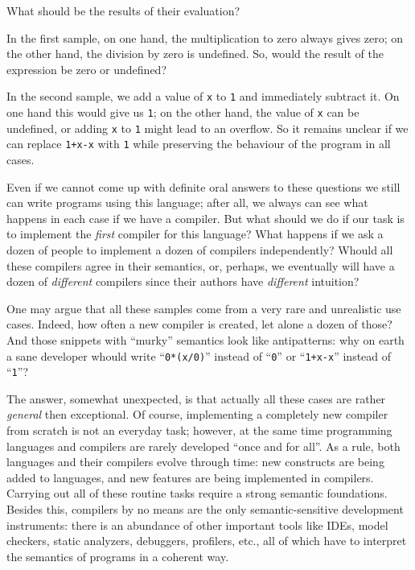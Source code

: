 What should be the results of their evaluation?

In the first sample, on one hand, the multiplication to zero always gives zero; on the other hand, the division by zero is undefined. So, would the result of
the expression be zero or undefined?

In the second sample, we add a value of \lstinline|x| to \lstinline|1| and immediately subtract it. On one hand this would give us \lstinline|1|; on the
other hand, the value of \lstinline|x| can be undefined, or adding \lstinline|x| to \lstinline|1| might lead to an overflow. So it remains unclear if we
can replace \lstinline|1+x-x| with \lstinline|1| while preserving the behaviour of the program in all cases.

Even if we cannot come up with definite oral answers to these questions we still can write programs using this language; after all, we always can
see what happens in each case if we have a compiler. But what should we do if our task is to implement the \emph{first} compiler for this language?
What happens if we ask a dozen of people to implement a dozen of compilers independently? Whould all these compilers agree in their semantics, or, perhaps, we
eventually will have a dozen of \emph{different} compilers since their authors have \emph{different} intuition? 

One may argue that all these samples come from a very rare and unrealistic use cases. Indeed, how often a new compiler is created, let alone a
dozen of those? And those snippets with ``murky'' semantics look like antipatterns: why on earth a sane developer whould write ``\lstinline|0*(x/0)|''
instead of ``\lstinline|0|'' or ``\lstinline|1+x-x|'' instead of ``\lstinline|1|''?

The answer, somewhat unexpected, is that actually all these cases are rather \emph{general} then exceptional. Of course, implementing a completely new compiler from scratch is not an
everyday task; however, at the same time programming languages and compilers are rarely developed ``once and for all''. As a rule, both languages
and their compilers evolve through time: new constructs are being added to languages, and new features are being implemented in compilers. Carrying out all of
these routine tasks require a strong semantic foundations. Besides this, compilers by no means are the only semantic-sensitive development instruments:
there is an abundance of other important tools like IDEs, model checkers, static analyzers, debuggers, profilers, etc., all of which have to interpret the
semantics of programs in a coherent way.

